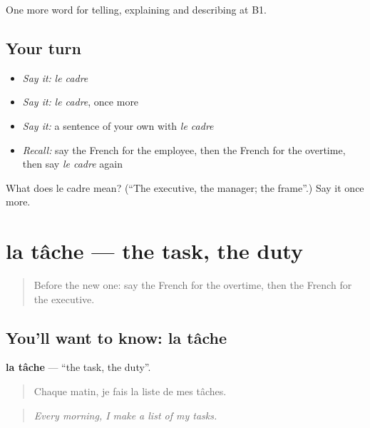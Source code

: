 \begin{grammarlens}[title={What you've built}]
One more word for telling, explaining and describing at B1.
\end{grammarlens}

\subsection*{Your turn}
\begin{itemize}
\raggedright
  \item \emph{Say it:} \emph{le cadre}
  \item \emph{Say it:} \emph{le cadre}, once more
  \item \emph{Say it:} a sentence of your own with \emph{le cadre}
  \item \emph{Recall:} say the French for the employee, then the French for the overtime, then say \emph{le cadre} again
\end{itemize}

\begin{tcolorbox}[breakable,colback=teal!4,colframe=teal!35!black,title={Before you move on}]
What does le cadre mean? (\textquotedblleft{}The executive, the manager; the frame\textquotedblright{}.) Say it once more.
\end{tcolorbox}
\section[la tâche]{la tâche — the task, the duty}

\label{lesson:FR-C359-tache}



\begin{quote}
Before the new one: say the French for the overtime, then the French for the executive.
\end{quote}

\subsection*{You'll want to know: la tâche}
\textbf{la tâche} — \textquotedblleft{}the task, the duty\textquotedblright{}.

\begin{quote}
Chaque matin, je fais la liste de mes tâches.
\end{quote}

\begin{quote}
\emph{Every morning, I make a list of my tasks.}
\end{quote}

